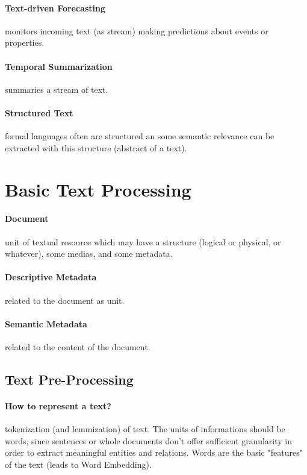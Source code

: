 \paragraph{Text-driven Forecasting} monitors incoming text (as stream) making predictions about events or properties.

\paragraph{Temporal Summarization} summaries a stream of text.

\paragraph{Structured Text} formal languages often are structured an some semantic relevance can be extracted with this structure (abstract of a text).

\section{Basic Text Processing}

\paragraph{Document} unit of textual resource which may have a structure (logical or physical, or whatever), some medias, and some metadata.

\paragraph{Descriptive Metadata} related to the document as unit.

\paragraph{Semantic Metadata} related to the content of the document.

\subsection{Text Pre-Processing}

\paragraph{How to represent a text?} tokenization (and lemmization) of text. The units of informations should be words, since sentences or whole documents don't offer sufficient granularity in order to extract meaningful entities and relations. Words are the basic "features" of the text (leads to Word Embedding).

